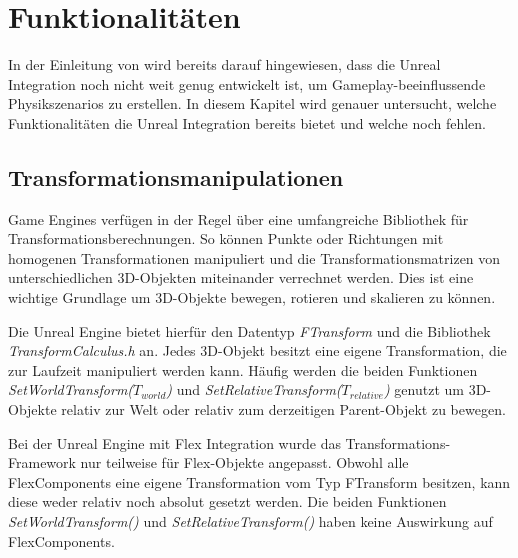 
\clearpage
\section{Funktionalitäten}
In der Einleitung von \cite{UE4FlexDoc} wird bereits darauf hingewiesen, dass die Unreal Integration noch nicht weit genug entwickelt ist, um Gameplay-beeinflussende Physikszenarios zu erstellen. In diesem Kapitel wird genauer untersucht, welche   Funktionalitäten  die Unreal Integration bereits bietet und welche noch fehlen. 



\subsection{Transformationsmanipulationen}


Game Engines verfügen in der Regel über eine umfangreiche Bibliothek für Transformationsberechnungen. So können Punkte oder Richtungen mit homogenen Transformationen manipuliert und die Transformationsmatrizen von unterschiedlichen 3D-Objekten miteinander verrechnet werden.
Dies ist eine wichtige Grundlage um 3D-Objekte bewegen, rotieren und skalieren zu können. 

Die Unreal Engine bietet hierfür den Datentyp \textit{FTransform} und die Bibliothek \textit{TransformCalculus.h} an. Jedes 3D-Objekt besitzt eine eigene Transformation, die zur Laufzeit manipuliert werden kann. Häufig werden die beiden Funktionen \textit{SetWorldTransform($T_{world}$)} und \textit{SetRelativeTransform($T_{relative}$)} genutzt um 3D-Objekte relativ zur Welt oder relativ zum derzeitigen Parent-Objekt zu bewegen.

Bei der Unreal Engine mit Flex Integration wurde das Transformations-Framework nur teilweise für Flex-Objekte angepasst. Obwohl alle FlexComponents eine eigene Transformation vom Typ FTransform besitzen, kann diese weder relativ noch absolut gesetzt werden. Die beiden Funktionen \textit{SetWorldTransform()} und \textit{SetRelativeTransform()} haben keine Auswirkung auf FlexComponents.

